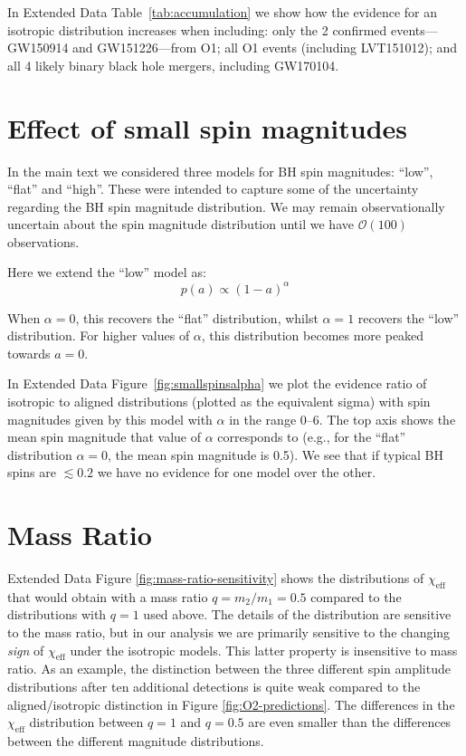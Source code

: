 \documentclass{nature-arxiv}
\newcommand{\chieff}{\chi_\mathrm{eff}}
\begin{document}
\begin{methods}
In Extended Data Table~\ref{tab:accumulation} we show how the evidence for an isotropic distribution increases when including: only the 2 confirmed events---GW150914 and GW151226---from O1; all O1 events (including LVT151012); and all 4 likely binary black hole mergers, including GW170104. 

\section{Effect of small spin magnitudes}
\label{sec:smallspins}

In the main text we considered three models for BH spin magnitudes:
``low'', ``flat'' and ``high''. These were intended to capture some of
the uncertainty regarding the BH spin magnitude distribution.  We may
remain observationally uncertain about the spin magnitude distribution
until we have $\mathcal{O}(100)$
observations\cite{2017arXiv170306869F,2017arXiv170306223G}.

Here we extend the ``low'' model as:
%
\begin{equation}
p(a) \propto (1 - a)^{\alpha}
\label{eq:lowspinalpha}
\end{equation}
%

When $\alpha = 0$, this recovers the ``flat'' distribution, whilst
$\alpha = 1$ recovers the ``low'' distribution. For higher values of
$\alpha$, this distribution becomes more peaked towards
$a = 0$.

%
%

In Extended Data Figure~\ref{fig:smallspinsalpha} we plot the evidence
ratio of isotropic to aligned distributions (plotted as the equivalent
sigma) with spin magnitudes given by this model with $\alpha$ in the
range $0$--$6$. The top axis shows the mean spin magnitude that value
of $\alpha$ corresponds to (e.g., for the ``flat'' distribution
$\alpha = 0$, the mean spin magnitude is 0.5). We see that if typical
BH spins are $\lesssim 0.2$ we have no evidence for one model over the
other.

\section{Mass Ratio}
\label{sec:mass-ratio}

Extended Data Figure \ref{fig:mass-ratio-sensitivity} shows the
distributions of $\chieff$ that would obtain with a mass ratio
$q = m_2/m_1 = 0.5$ compared to the distributions with $q = 1$ used
above.  The details of the distribution are sensitive to the mass
ratio, but in our analysis we are primarily sensitive to the changing
\emph{sign} of $\chieff$ under the isotropic models.  This latter
property is insensitive to mass ratio.  As an example, the distinction
between the three different spin amplitude distributions after ten
additional detections is quite weak compared to the aligned/isotropic
distinction in Figure \ref{fig:O2-predictions}.  The differences in
the $\chieff$ distribution between $q = 1$ and $q = 0.5$ are even
smaller than the differences between the different magnitude
distributions.



\end{methods}
\end{document}

